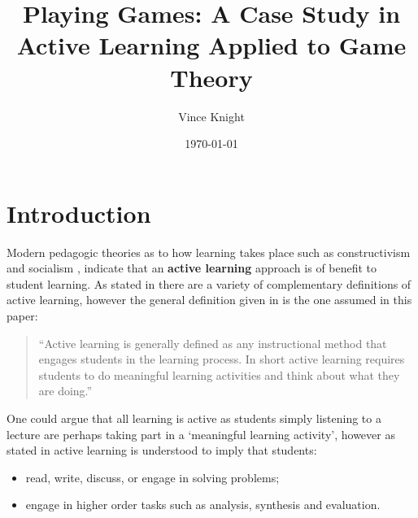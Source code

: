 \documentclass{article}
\title{Playing Games: A Case Study in Active Learning Applied to Game Theory}
\author{Vince Knight}
\date{\today}
\begin{document}
\maketitle


\section{Introduction}\label{sec:introduction}

Modern pedagogic theories as to how learning takes place such as constructivism
and socialism \cite{Illeris2009, Jordan2008a}, indicate that an \textbf{active
learning} approach is of benefit to student learning.  As stated in
\cite{Prince2004} there are a variety of complementary definitions of active
learning, however the general definition given in \cite{Prince2004} is the one
assumed in this paper:

\begin{quote}
``Active learning is generally defined as any instructional method that engages
students in the learning process. In short active learning requires students to
do meaningful learning activities and think about what they are doing.''
\end{quote}

One could argue that all learning is active as students simply listening to a
lecture are perhaps taking part in a `meaningful learning activity', however as
stated in \cite{Bonwell1991} active learning is understood to imply that
students:

\begin{itemize}
    \item read, write, discuss, or engage in solving problems;
    \item engage in higher order tasks such as analysis, synthesis and
        evaluation.
\end{itemize}
\end{document}
